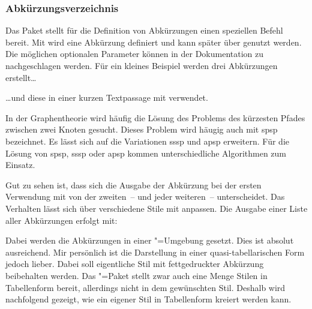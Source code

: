 \documentclass[%
  english,ngerman,%
  geometry=no,DIV=12,automark,%
]{tudscrartcl}
\begin{document}
\subsubsection{Abkürzungsverzeichnis}
Das Paket  stellt für die Definition von Abkürzungen einen 
speziellen Befehl bereit. Mit\LParameter{}%
 wird eine Abkürzung definiert und 
kann später über  genutzt werden. Die möglichen optionalen 
Parameter können in der Dokumentation zu  nachgeschlagen 
werden. Für ein kleines Beispiel werden drei Abkürzungen erstellt\dots
%
\begin{Excerpt}
\end{Excerpt}
%
\dots und diese in einer kurzen Textpassage mit  
verwendet.
%
\begin{Excerpt}
In der Graphentheorie wird häufig die Lösung des Problems des kürzesten
Pfades zwischen zwei Knoten gesucht. Dieses Problem wird häugig auch
mit \gls{spsp} bezeichnet. Es lässt sich auf die Variationen \gls{sssp}
und \gls{apsp} erweitern. Für die Lösung von \gls{spsp}, \gls{sssp} oder 
\gls{apsp} kommen unterschiedliche Algorithmen zum Einsatz.
\end{Excerpt}
%
Gut zu sehen ist, dass sich die Ausgabe der Abkürzung bei der ersten Verwendung 
mit  von der zweiten~-- und jeder weiteren~-- unterscheidet. Das 
Verhalten lässt sich über verschiedene Stile mit  
anpassen. Die Ausgabe einer Liste aller Abkürzungen erfolgt mit:
%
\begin{Hint*}
\printacronyms
\end{Hint*}
\begin{quoting}[rightmargin=0pt]
\vspace*{-\baselineskip}
\glsdisablehyper
\InputExcerpt
\end{quoting}
%
Dabei werden die Abkürzungen in einer "=Umgebung 
gesetzt. Dies ist absolut ausreichend. Mir persönlich ist die Darstellung in 
einer quasi-tabellarischen Form jedoch lieber. Dabei soll eigentliche Stil mit 
fettgedruckter Abkürzung beibehalten werden. Das "=Paket 
stellt zwar auch eine Menge Stilen in Tabellenform bereit, allerdings nicht in 
dem gewünschten Stil. Deshalb wird nachfolgend gezeigt, wie ein eigener Stil in 
Tabellenform kreiert werden kann. 
\end{document}
